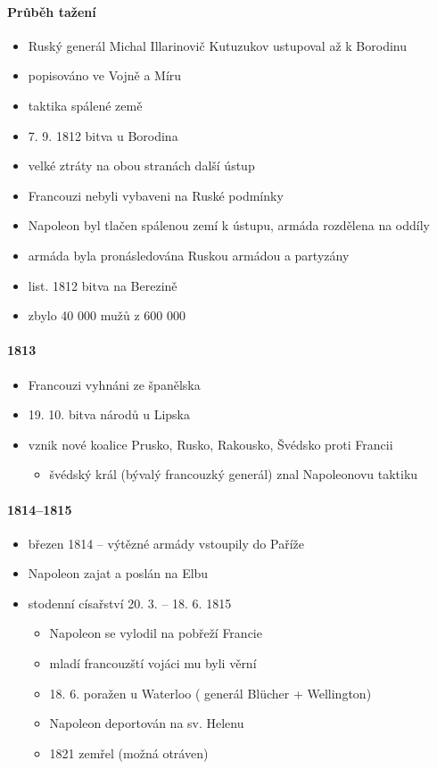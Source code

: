 \paragraph{Průběh tažení}
\begin{itemize}
\item Ruský generál Michal Illarinovič Kutuzukov ustupoval až k Borodinu
\item popisováno ve Vojně a Míru
\item taktika spálené země 
\item 7. 9. 1812 bitva u Borodina
\item velké ztráty na obou stranách \ra další ústup
\item Francouzi nebyli vybaveni na Ruské podmínky
\item Napoleon byl tlačen spálenou zemí k ústupu, armáda rozdělena na oddíly
\item armáda byla pronásledována Ruskou armádou a partyzány
\item list. 1812 bitva na Berezině 
\item zbylo 40 000 mužů z 600 000
\end{itemize}

\paragraph{1813}
\begin{itemize}
\item Francouzi vyhnáni ze španělska
\item 19. 10. bitva národů u Lipska
\item vznik nové koalice Prusko, Rusko, Rakousko, Švédsko proti Francii
	\begin{itemize}
	\item švédský král (bývalý francouzký generál) znal Napoleonovu taktiku
	\end{itemize}
\end{itemize}

\paragraph{1814--1815}
\begin{itemize}
\item březen 1814 -- výtězné armády vstoupily do Paříže
\item Napoleon zajat a poslán na Elbu
\item stodenní císařství 20. 3. -- 18. 6. 1815
	\begin{itemize}
	\item Napoleon se vylodil na pobřeží Francie
	\item mladí francouzští vojáci mu byli věrní
	\item 18. 6. poražen u Waterloo  ( generál Blücher + Wellington)
	\item Napoleon deportován na sv. Helenu
	\item 1821 zemřel (možná otráven)
	\end{itemize}
\end{itemize}




